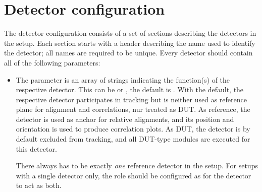 \section{Detector configuration}
\label{sec:detector_config}
The detector configuration consists of a set of sections describing the detectors in the setup.
Each section starts with a header describing the name used to identify the detector; all names are required to be unique.
Every detector should contain all of the following parameters:
\begin{itemize}
\item The  parameter is an array of strings indicating the function(s) of the respective detector. This can be  or , the default is . With the default, the respective detector participates in tracking but is neither used as reference plane for alignment and correlations, nur treated as DUT. As reference, the detector is used as anchor for relative alignments, and its position and orientation is used to produce correlation plots. As DUT, the detector is by default excluded from tracking, and all DUT-type modules are executed for this detector.
\begin{warning}
There always has to be exactly \emph{one} reference detector in the setup. For setups with a single detector only, the role should be configured as  for the detector to act as both.
\end{warning}


\end{itemize}
